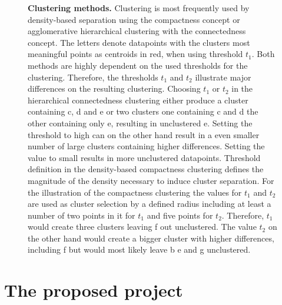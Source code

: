 \begin{figure}
\begin{subfigure}[b]{0.475\textwidth}
    \end{subfigure}
    \caption[Clustering methods]{\textbf{Clustering methods.} Clustering is most frequently used by density-based separation using the compactness concept or agglomerative hierarchical clustering with the connectedness concept. The letters denote datapoints with the clusters most meaningful points as centroids in red, when using threshold $t_1$. Both methods are highly dependent on the used thresholds for the clustering. Therefore, the thresholds $t_1$ and $t_2$ illustrate major differences on the resulting clustering. Choosing $t_1$ or $t_2$ in the hierarchical connectedness clustering either produce a cluster containing c, d and e or two clusters one containing c and d the other containing only e, resulting in unclustered e. Setting the threshold to high can on the other hand result in a even smaller number of large clusters containing higher differences. Setting the value to small results in more unclustered datapoints. Threshold definition in the density-based compactness clustering defines the magnitude of the density necessary to induce cluster separation. For the illustration of the compactness clustering the values for $t_1$ and $t_2$ are used as cluster selection by a defined radius including at least a number of two points in it for $t_1$ and five points for $t_2$. Therefore, $t_1$ would create three clusters leaving f out unclustered. The value $t_2$ on the other hand would create a bigger cluster with higher differences, including f but would most likely leave b e and g unclustered.}
    \label{fig:Methods}
\end{figure}

\section{The proposed project}

